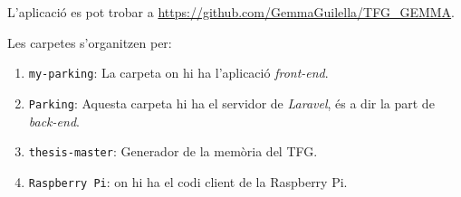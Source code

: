 L'aplicació es pot trobar a \url{https://github.com/GemmaGuilella/TFG_GEMMA}.

Les carpetes s'organitzen per:
\begin{enumerate}
    \item \texttt{my-parking}: La carpeta on hi ha l'aplicació \emph{front-end}.
    \item \texttt{Parking}: Aquesta carpeta hi ha el servidor de \emph{Laravel}, és a dir la part de \emph{back-end}.
    \item \texttt{thesis-master}: Generador de la memòria del TFG.
    \item \texttt{Raspberry Pi}: on hi ha el codi client de la Raspberry Pi.
\end{enumerate}


